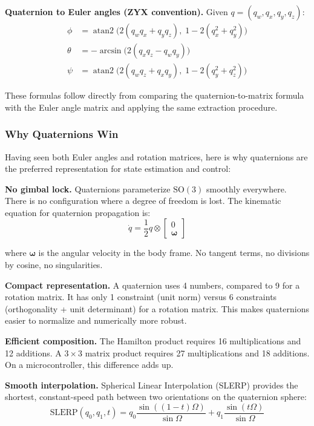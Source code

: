 \textbf{Quaternion to Euler angles (ZYX convention).} Given $q = (q_w, q_x, q_y, q_z)$:
\begin{align}
\phi &= \operatorname{atan2}\!\big(2(q_w q_x + q_y q_z), \; 1 - 2(q_x^2 + q_y^2)\big) \\
\theta &= -\arcsin\!\big(2(q_x q_z - q_w q_y)\big) \\
\psi &= \operatorname{atan2}\!\big(2(q_w q_z + q_x q_y), \; 1 - 2(q_y^2 + q_z^2)\big)
\end{align}

These formulas follow directly from comparing the quaternion-to-matrix formula with the Euler angle matrix and applying the same extraction procedure.

\subsubsection{Why Quaternions Win}

Having seen both Euler angles and rotation matrices, here is why quaternions are the preferred representation for state estimation and control:

\textbf{No gimbal lock.} Quaternions parameterize $\mathrm{SO}(3)$ smoothly everywhere. There is no configuration where a degree of freedom is lost. The kinematic equation for quaternion propagation is:
\begin{equation}
\dot{q} = \frac{1}{2} q \otimes \begin{bmatrix} 0 \\ \boldsymbol{\omega} \end{bmatrix}
\end{equation}

where $\boldsymbol{\omega}$ is the angular velocity in the body frame. No tangent terms, no divisions by cosine, no singularities.

\textbf{Compact representation.} A quaternion uses 4 numbers, compared to 9 for a rotation matrix. It has only 1 constraint (unit norm) versus 6 constraints (orthogonality + unit determinant) for a rotation matrix. This makes quaternions easier to normalize and numerically more robust.

\textbf{Efficient composition.} The Hamilton product requires 16 multiplications and 12 additions. A $3 \times 3$ matrix product requires 27 multiplications and 18 additions. On a microcontroller, this difference adds up.

\textbf{Smooth interpolation.} Spherical Linear Interpolation (SLERP) provides the shortest, constant-speed path between two orientations on the quaternion sphere:
\begin{equation}
\text{SLERP}(q_0, q_1, t) = q_0 \frac{\sin((1-t)\Omega)}{\sin\Omega} + q_1 \frac{\sin(t\Omega)}{\sin\Omega}
\end{equation}

